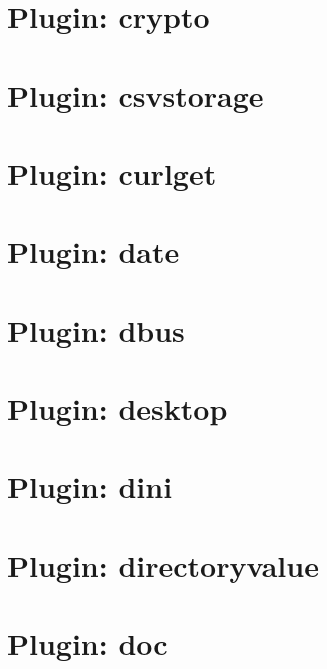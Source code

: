 \documentclass[twoside]{book}
\newcommand{\+}{\discretionary{\mbox{\scriptsize$\hookleftarrow$}}{}{}}
\begin{document}
\chapter{Plugin\+: crypto}
\label{md_src_plugins_crypto_README}

\chapter{Plugin\+: csvstorage}
\label{md_src_plugins_csvstorage_README}

\chapter{Plugin\+: curlget}
\label{md_src_plugins_curlget_README}

\chapter{Plugin\+: date}
\label{md_src_plugins_date_README}

\chapter{Plugin\+: dbus}
\label{md_src_plugins_dbus_README}

\chapter{Plugin\+: desktop}
\label{md_src_plugins_desktop_README}

\chapter{Plugin\+: dini}
\label{md_src_plugins_dini_README}

\chapter{Plugin\+: directoryvalue}
\label{md_src_plugins_directoryvalue_README}

\chapter{Plugin\+: doc}
\label{md_src_plugins_doc_README}

\end{document}
